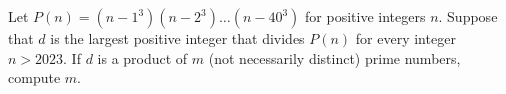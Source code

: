 Let $P(n)=\left(n-1^{3}\right)\left(n-2^{3}\right) \ldots\left(n-40^{3}\right)$ for positive integers $n$. Suppose that $d$ is the largest positive integer that divides $P(n)$ for every integer $n>2023$. If $d$ is a product of $m$ (not necessarily distinct) prime numbers, compute $m$.
